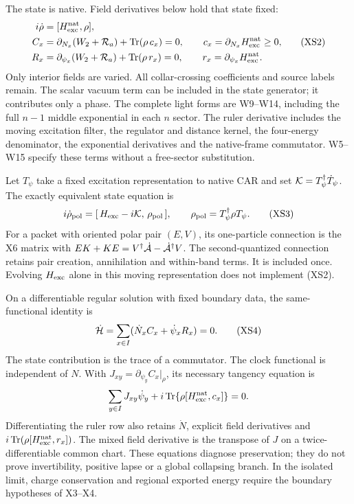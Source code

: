 \documentclass[11pt]{article}
\DeclareMathOperator{\Tr}{Tr}
\begin{document}
The state is native.  Field derivatives below hold that state
fixed:
\begin{equation}
 \begin{aligned}
 i\dot\rho&=[H_{\rm exc}^{\rm nat},\rho],\\
 C_x&=\partial_{N_x}(W_2+{\cal R}_a)
               +\Tr(\rho\,c_x)=0,\qquad
 c_x=\partial_{N_x}H_{\rm exc}^{\rm nat}\geq0,\\
 R_x&=\partial_{\psi_x}(W_2+{\cal R}_a)
               +\Tr(\rho\,r_x)=0,\qquad
 r_x=\partial_{\psi_x}H_{\rm exc}^{\rm nat}.
 \end{aligned}\tag{XS2}
\end{equation}
Only interior fields are varied.  All collar-crossing
coefficients and source labels remain.  The scalar vacuum
term can be included in the state generator; it contributes
only a phase.  The complete light forms are W9--W14,
including the full $n-1$ middle exponential in each $n$ sector.
The ruler derivative includes the moving excitation filter,
the regulator and distance kernel, the four-energy denominator,
the exponential derivatives and the native-frame commutator.
W5--W15 specify these terms without a free-sector substitution.

Let $T_\psi$ take a fixed excitation representation to native
CAR and set ${\cal K}=T_\psi^\dagger\dot T_\psi$.
The exactly equivalent state equation is
\begin{equation}
 i\dot\rho_{\rm pol}
 =[\,H_{\rm exc}-i{\cal K},\,\rho_{\rm pol}\,],
 \qquad \rho_{\rm pol}=T_\psi^\dagger\rho T_\psi .
 \tag{XS3}
\end{equation}
For a packet with oriented polar pair $(E,V)$, its one-particle
connection is the X6 matrix with
$EK+KE=V^\dagger\dot{\cal A}-\dot{\cal A}^\dagger V$.
The second-quantized connection retains pair creation,
annihilation and within-band terms.  It is included once.
Evolving $H_{\rm exc}$ alone in this moving representation
does not implement (XS2).

On a differentiable regular solution with fixed boundary data,
the same-functional identity is
\begin{equation}
 \dot{\cal H}=\sum_{x\in I}
           (\dot N_x C_x+\dot\psi_xR_x)=0.
 \tag{XS4}
\end{equation}
The state contribution is the trace of a commutator.
The clock functional is independent of $N$.  With
$J_{xy}=\partial_{\psi_y}C_x|_\rho$, its necessary tangency
equation is
\[
 \sum_{y\in I}J_{xy}\dot\psi_y
       +i\Tr\{\rho[H_{\rm exc}^{\rm nat},c_x]\}=0 .
\]
Differentiating the ruler row also retains $\dot N$, explicit
field derivatives and $i\Tr(\rho[H_{\rm exc}^{\rm nat},r_x])$.
The mixed field derivative is the transpose of $J$ on a
twice-differentiable common chart.  These equations diagnose
preservation; they do not prove invertibility, positive lapse
or a global collapsing branch.  In the isolated limit,
charge conservation and regional exported energy require
the boundary hypotheses of X3--X4.
\end{document}
